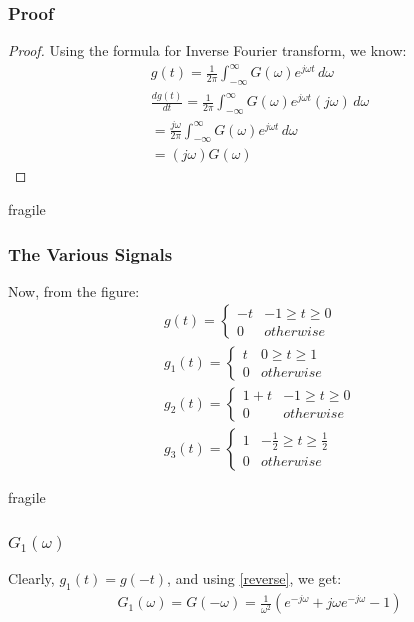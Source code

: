 \documentclass{beamer}
\begin{document}
\begin{frame}[fragile]
\frametitle{Proof}
\begin{flushleft}

\begin{proof}
Using the formula for Inverse Fourier transform, we know:
\begin{align}
    g(t) = \frac{1}{2\pi}\int_{-\infty}^{\infty}G(\omega)e^{j\omega t} \,d\omega\\
    \frac{d g(t)}{dt} = \frac{1}{2\pi}\int_{-\infty}^{\infty}G(\omega)e^{j\omega t} (j\omega) \,d\omega\\
    = \frac{j\omega}{2\pi}\int_{-\infty}^{\infty}G(\omega)e^{j\omega t} \,d\omega\\
     = (j\omega)G(\omega)
\end{align}
\end{proof}
\end{flushleft}
\end{frame}


\begin{frame}{fragile}
\frametitle{The Various Signals}

\begin{flushleft}
Now, from the figure:
\begin{align}
    g(t) = 
    \begin{cases}
    -t & -1 \geq t \geq 0\\
    0 & otherwise
    \end{cases}\\
    g_1(t) = 
    \begin{cases}
    t & 0 \geq t \geq 1\\
    0 & otherwise
    \end{cases}\\
    g_2(t) = 
    \begin{cases}
    1+t & -1 \geq t \geq 0\\
    0 & otherwise
    \end{cases}\\
    g_3(t) = 
    \begin{cases}
    1 & -\frac{1}{2} \geq t \geq \frac{1}{2}\\
    0 & otherwise
    \end{cases}
\end{align}
\end{flushleft}

\end{frame}
\begin{frame}{fragile}
\frametitle{$G_1(\omega)$}

\begin{flushleft}
Clearly, $g_1(t) = g(-t)$, and using \eqref{reverse}, we get:
\begin{align}
    G_1(\omega) = G(-\omega) = \frac{1}{\omega^2}(e^{-j\omega} + j\omega e^{-j\omega} - 1)
\end{align}
\end{flushleft}
\end{frame}
\end{document}
